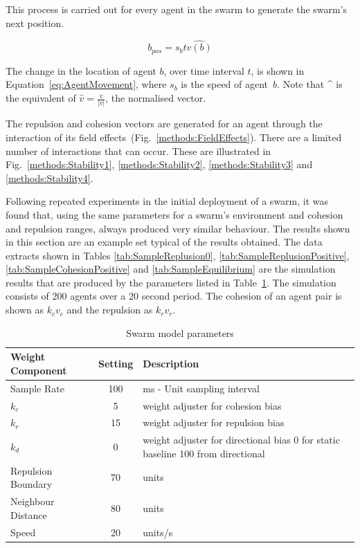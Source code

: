 \documentclass{ieeeaccess}
\begin{document}
This process is carried out for every agent in the swarm to generate the
swarm's next position.

\begin{center}
\begin{equation}
\label{eq:AgentMovement}
  b_{pos}=s_{b}t\widehat{v(b)} 
\end{equation}
\end{center}

The change in the location of agent $b$, over time interval $t$, is shown in
Equation~\ref{eq:AgentMovement}, where $s_b$ is the speed of agent~$b$. Note
that \string^ is the equivalent of $\hat{v} = \frac{v}{|v|}$, the normalised
vector.

The repulsion and cohesion vectors are generated for an agent through the
interaction of its field effects~(Fig.~\ref{methods:FieldEffects}). There are
a limited number of interactions that can occur. These are illustrated in
Fig.~\ref{methods:Stability1}, \ref{methods:Stability2},
\ref{methods:Stability3} and \ref{methods:Stability4}.

Following repeated experiments in the initial deployment of a swarm, it was
found that, using the same parameters for a swarm's environment and
cohesion and repulsion ranges, always produced very similar behaviour.
The results shown in this section are an example set typical of the
results obtained. The data extracts shown in Tables \ref{tab:SampleReplusion0},
\ref{tab:SampleReplusionPositive}, \ref{tab:SampleCohesionPositive} and
\ref{tab:SampleEquilibrium} are the simulation results that are produced by the
parameters listed in Table~\ref{tab:MetricPhysics1}. The simulation consists of
200 agents over a 20 second period. The cohesion of an agent pair is shown as
$k_cv_c$ and the repulsion as $k_rv_r$.

\begin{table}[H]
\begin{center}
\begin{tabular}{| p{2.5cm} | c | p{3cm} |}
\hline
\bf Weight \bf Component & \bf Setting & \bf Description \\ \hline
Sample Rate & 100 & ms - Unit sampling interval\\  \hline
$k_c$ & 5 & weight adjuster for cohesion bias\\  \hline
$k_r$ & 15 & weight adjuster for repulsion  bias\\  \hline
$k_d$ & 0 & weight adjuster for directional bias 0 for static baseline 100 from directional\\  \hline
Repulsion Boundary & 70 & units\\  \hline
Neighbour Distance & 80 & units\\  \hline
Speed & 20 & units/s\\  \hline
\end{tabular}\caption{Swarm model parameters} \label{tab:MetricPhysics1}
\end{center}
\end{table}
\end{document}
